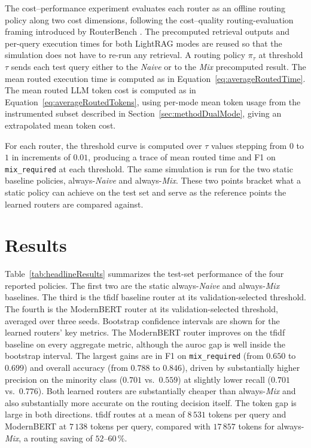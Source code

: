 \documentclass[english, bibtex]{kththesis}               %
\numberwithin{listing}{chapter}
\begin{document}
The cost--performance experiment evaluates each router as an offline routing policy along two cost dimensions, following the cost--quality routing-evaluation framing introduced by RouterBench \cite{hu2024routerbench}. The precomputed retrieval outputs and per-query execution times for both LightRAG modes are reused so that the simulation does not have to re-run any retrieval. A routing policy $\pi_{\tau}$ at threshold $\tau$ sends each test query either to the \emph{Naive} or to the \emph{Mix} precomputed result. The mean routed execution time is computed as in Equation~\ref{eq:averageRoutedTime}. The mean routed LLM token cost is computed as in Equation~\ref{eq:averageRoutedTokens}, using per-mode mean token usage from the instrumented subset described in Section~\ref{sec:methodDualMode}, giving an extrapolated mean token cost.

For each router, the threshold curve is computed over $\tau$ values stepping from $0$ to $1$ in increments of $0.01$, producing a trace of mean routed time and F1 on \texttt{mix\_required} at each threshold. The same simulation is run for the two static baseline policies, always-\emph{Naive} and always-\emph{Mix}. These two points bracket what a static policy can achieve on the test set and serve as the reference points the learned routers are compared against.

\section{Results}
\label{sec:implResults}

Table~\ref{tab:headlineResults} summarizes the test-set performance of the four reported policies. The first two are the static always-\emph{Naive} and always-\emph{Mix} baselines. The third is the \gls{tfidf} baseline router at its validation-selected threshold. The fourth is the ModernBERT router at its validation-selected threshold, averaged over three seeds. Bootstrap confidence intervals are shown for the learned routers' key metrics. The ModernBERT router improves on the \gls{tfidf} baseline on every aggregate metric, although the \gls{auroc} gap is well inside the bootstrap interval. The largest gains are in F1 on \texttt{mix\_required} (from $0.650$ to $0.699$) and overall accuracy (from $0.788$ to $0.846$), driven by substantially higher precision on the minority class ($0.701$ vs.\ $0.559$) at slightly lower recall ($0.701$ vs.\ $0.776$). Both learned routers are substantially cheaper than always-\emph{Mix} and also substantially more accurate on the routing decision itself. The token gap is large in both directions. \gls{tfidf} routes at a mean of $8\,531$ tokens per query and ModernBERT at $7\,138$ tokens per query, compared with $17\,857$ tokens for always-\emph{Mix}, a routing saving of $52$--$60\,\%$.
\end{document}
